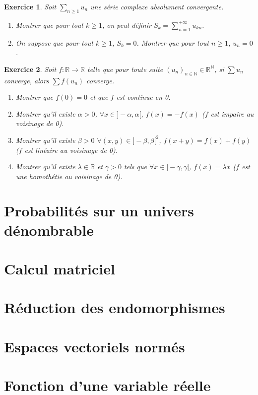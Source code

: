 \documentclass[12pt]{article}
\newtheorem{exercise}{Exercice}[section]
\theoremstyle{remark}
\theoremstyle{remark}
\newcommand{\R}{\mathbb{R}}
\newcommand{\N}{\mathbb{N}}
\begin{document}
\begin{exercise}
	Soit $\sum_{n\geqslant1}u_{n}$ une série complexe absolument convergente.
	\begin{enumerate}
		\item Montrer que pour tout $k\geqslant1$, on peut définir $S_{k}=\sum_{n=1}^{+\infty}u_{kn}$.
		\item On suppose que pour tout $k\geqslant1$, $S_{k}=0$. Montrer que
		pour tout $n\geqslant1$, $u_{n}=0$.
	\end{enumerate}
\end{exercise}

\begin{exercise}
	Soit $f:\R\to\R$ telle que pour toute suite $(u_{n})_{n\in\N}\in\R^{\N}$, si
$\sum u_{n}$ converge, alors $\sum f(u_{n})$ converge.
\begin{enumerate}
	\item Montrer que $f(0)=0$ et que $f$ est continue en 0.
	\item Montrer qu'il existe $\alpha>0$, $\forall x\in]-\alpha,\alpha[$,
	$f(x)=-f(x)$ ($f$ est impaire au voisinage de 0).
	\item Montrer qu'il existe $\beta>0$ $\forall(x,y)\in]-\beta,\beta[^{2}$,
	$f(x+y)=f(x)+f(y)$ ($f$ est linéaire au voisinage de 0).
	\item Montrer qu'il existe $\lambda\in\R$ et $\gamma>0$ tels que $\forall
	x\in]-\gamma,\gamma[$, $f(x)=\lambda x$ ($f$ est une homothétie au voisinage
	de 0).
\end{enumerate}
\end{exercise}

\cleardoublepage
\section{Probabilités sur un univers dénombrable}
\cleardoublepage
\section{Calcul matriciel}
\cleardoublepage
\section{Réduction des endomorphismes}
\cleardoublepage
\section{Espaces vectoriels normés}
\cleardoublepage
\section{Fonction d'une variable réelle}
\cleardoublepage
\end{document}
